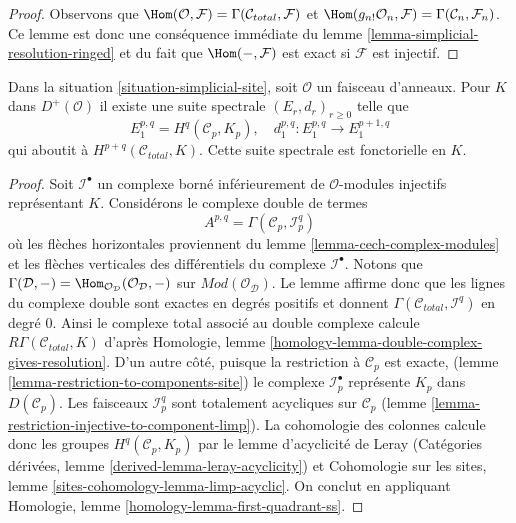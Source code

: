 \begin{proof}
Observons que
$\Hom(\mathcal{O}, \mathcal{F}) = \Gamma(\mathcal{C}_{total}, \mathcal{F})$
et
$\Hom(g_{n!}\mathcal{O}_n, \mathcal{F}) = \Gamma(\mathcal{C}_n, \mathcal{F}_n)$.
Ce lemme est donc une conséquence immédiate du lemme
\ref{lemma-simplicial-resolution-ringed}
et du fait que $\Hom(-, \mathcal{F})$ est exact si
$\mathcal{F}$ est injectif.
\end{proof}

\begin{lemma}
\label{lemma-simplicial-module-cohomology-site}
Dans la situation \ref{situation-simplicial-site}, soit $\mathcal{O}$
un faisceau d'anneaux. Pour $K$ dans $D^+(\mathcal{O})$
il existe une suite spectrale $(E_r, d_r)_{r \geq 0}$ telle que
$$
E_1^{p, q} = H^q(\mathcal{C}_p, K_p),\quad
d_1^{p, q} : E_1^{p, q} \to E_1^{p + 1, q}
$$
qui aboutit à $H^{p + q}(\mathcal{C}_{total}, K)$.
Cette suite spectrale est fonctorielle en $K$.
\end{lemma}

\begin{proof}
Soit $\mathcal{I}^\bullet$ un complexe borné inférieurement de
$\mathcal{O}$-modules injectifs représentant $K$. Considérons le complexe double de termes
$$
A^{p, q} = \Gamma(\mathcal{C}_p, \mathcal{I}^q_p)
$$
où les flèches horizontales proviennent du
lemme \ref{lemma-cech-complex-modules}
et les flèches verticales des différentiels du complexe
$\mathcal{I}^\bullet$. Notons que
$\Gamma(\mathcal{D}, -) =
\Hom_{\mathcal{O}_\mathcal{D}}(\mathcal{O}_\mathcal{D}, -)$
sur $\textit{Mod}(\mathcal{O}_\mathcal{D})$. Le lemme
affirme donc que les lignes du complexe double sont exactes
en degrés positifs et donnent
$\Gamma(\mathcal{C}_{total}, \mathcal{I}^q)$ en degré $0$.
Ainsi le complexe total associé au double complexe
calcule $R\Gamma(\mathcal{C}_{total}, K)$ d'après
Homologie, lemme \ref{homology-lemma-double-complex-gives-resolution}.
D'un autre côté, puisque la restriction à $\mathcal{C}_p$ est exacte,
(lemme \ref{lemma-restriction-to-components-site})
le complexe $\mathcal{I}_p^\bullet$ représente $K_p$ dans
$D(\mathcal{C}_p)$. Les faisceaux $\mathcal{I}_p^q$
sont totalement acycliques sur $\mathcal{C}_p$
(lemme \ref{lemma-restriction-injective-to-component-limp}).
La cohomologie des colonnes calcule donc les groupes
$H^q(\mathcal{C}_p, K_p)$ par le lemme d'acyclicité de Leray
(Catégories dérivées, lemme \ref{derived-lemma-leray-acyclicity})
et
Cohomologie sur les sites, lemme \ref{sites-cohomology-lemma-limp-acyclic}.
On conclut en appliquant
Homologie, lemme \ref{homology-lemma-first-quadrant-ss}.
\end{proof}

